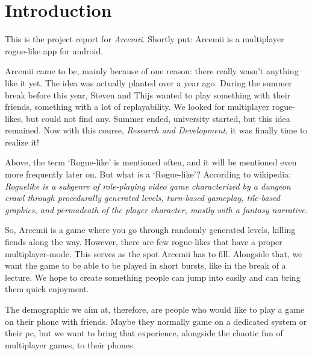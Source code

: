 \documentclass[../main.tex]{subfiles}
\begin{document}
\pagebreak
\section{Introduction}
This is the project report for \textit{Arcemii}. Shortly put: Arcemii is a multiplayer rogue-like app for android.

Arcemii came to be, mainly because of one reason: there really wasn't anything like it yet. The idea was actually planted over a year ago. During the summer break before this year, Steven and Thijs wanted to play something with their friends, something with a lot of replayability. We looked for multiplayer rogue-likes, but could not find any. Summer ended, university started, but this idea remained. Now with this course, \textit{Research and Development}, it was finally time to realize it!

\bigbreak\noindent
Above, the term `Rogue-like' is mentioned often, and it will be mentioned even more frequently later on. But what is a `Rogue-like'?  According to wikipedia: \textit{Roguelike is a subgenre of role-playing video game characterized by a dungeon crawl through procedurally generated levels, turn-based gameplay, tile-based graphics, and permadeath of the player character, mostly with a fantasy narrative.}

So, Arcemii is a game where you go through randomly generated levels, killing fiends along the way. However, there are few rogue-likes that have a proper multiplayer-mode. This serves as the  spot Arcemii has to fill. Alongside that, we want the game to be able to be played in short bursts, like in the break of a lecture. We hope to create something people can jump into easily and can bring them quick enjoyment. 

The demographic we aim at, therefore, are people who would like to play a game on their phone with friends. Maybe they normally game on a dedicated system or their pc, but we want to bring that experience, alongside the chaotic fun of multiplayer games, to their phones.
\end{document}
